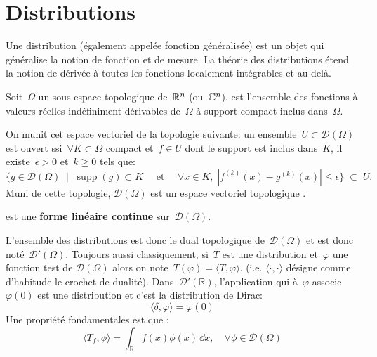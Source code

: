 \medskip
\section{Distributions}
Une distribution (également appelée fonction généralisée) est un objet qui généralise
la notion de fonction et de mesure.
La théorie des distributions étend la notion de dérivée à toutes les fonctions localement
intégrables et au-delà.

\medskip
\begin{definition}
Soit~$\Omega$ un sous-espace topologique de~$\mathbb R^n$ (ou~$\mathbb C^n$).
 est l'ensemble des fonctions
à valeurs réelles indéfiniment dérivables de~$\Omega$ à support compact inclus dans~$\Omega$.

On munit cet espace vectoriel de la topologie suivante: un ensemble~$U \subset \mathcal{D}(\Omega)$ est
ouvert ssi~$\forall K \subset \Omega$ compact et~$f \in U$ dont le support est inclus dans~$K$,
il existe~$\epsilon > 0$ et~$k \ge 0$ tels que:
\begin{equation}
  \{ g \in \mathcal{D}(\Omega)\;\mid\; \operatorname{supp}(g) \subset K\quad\text{ et }\quad\forall x \in K,\; |f^{(k)}(x)-g^{(k)}(x)|\le \epsilon \}\;\subset\;U.
\end{equation}
Muni de cette topologie, $\mathcal{D}(\Omega)$ est un espace vectoriel topologique .
\end{definition}

\medskip
\begin{definition}[Distribution]
 est une \textbf{forme linéaire continue}
sur~$\mathcal{D}(\Omega)$.
\end{definition}

L'ensemble des distributions est donc le dual topologique de~$\mathcal{D}(\Omega)$ et est donc noté~$\mathcal{D}'(\Omega)$.
\medskipvm
Toujours aussi classiquement, si~$T$ est une distribution et~$\varphi$ une fonction test de
$\mathcal{D}(\Omega)$ alors on note~$T(\varphi)=\langle T,\varphi \rangle$. (i.e.
$\langle\cdot,\cdot\rangle$ désigne comme d'habitude le crochet de dualité).
\medskipvm
Dans~$\mathcal{D}'(\mathbb{R})$, l'application qui à~$\varphi$ associe~$\varphi(0)$ est une distribution et c'est la distribution de Dirac:
\begin{equation}
\langle\delta,\varphi\rangle=\varphi(0)
\end{equation}
\medskipvm
Une propriété fondamentales est que :
\begin{equation}
  \langle T_f,\phi\rangle=\int_{\mathbb{R}}f(x)\phi(x)\,\dd x, \quad \forall \phi\in\mathcal{D}(\Omega)
\end{equation}


